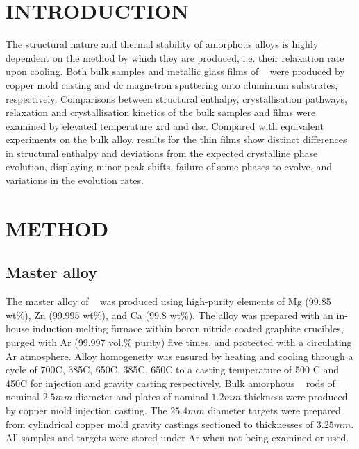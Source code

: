 \documentclass[a4paper,12pt,oneside]{article}%
\begin{document}
\newpage
\tableofcontents\newpage
{}
\clearpage %


\section{INTRODUCTION}
\glsresetall

The structural nature and thermal stability of amorphous alloys is highly dependent on the method by which they are produced, i.e. their relaxation rate upon cooling.  Both bulk samples and metallic glass films of \MgZnCa~ were produced by copper mold casting and \gls{dc} magnetron sputtering onto aluminium substrates, respectively. Comparisons between structural enthalpy, crystallisation pathways, relaxation and crystallisation kinetics of the bulk samples and films were examined by elevated temperature \acrshort{xrd} and \acrshort{dsc}. Compared with equivalent experiments on the bulk alloy, results for the thin films show distinct differences in structural enthalpy and deviations from the expected crystalline phase evolution, displaying minor peak shifts, failure of some phases to evolve, and variations in the evolution rates. 


\section{METHOD}

\subsection{Master alloy}
The master alloy of \MgZnCa~ was produced using high-purity elements of Mg (99.85 wt\%), Zn (99.995 wt\%), and Ca (99.8 wt\%). The alloy was prepared with an in-house induction melting furnace within boron nitride coated graphite crucibles, purged with Ar (99.997 vol.\% purity) five times, and protected with a circulating Ar atmosphere. Alloy homogeneity was ensured by heating and cooling through a cycle of 700\degree C, 385\degree C, 650\degree C, 385\degree C, 650\degree C to a casting temperature of 500 \degree C and 450\degree C for injection and gravity casting respectively. Bulk amorphous \MgZnCa~ rods of nominal $2.5 mm$ diameter and plates of nominal $1.2 mm$ thickness were produced by copper mold injection casting. The $25.4 mm$ diameter targets were prepared from cylindrical copper mold gravity castings sectioned to thicknesses of $3.25 mm$. All samples and targets were stored under Ar when not being examined or used. 
\end{document}
